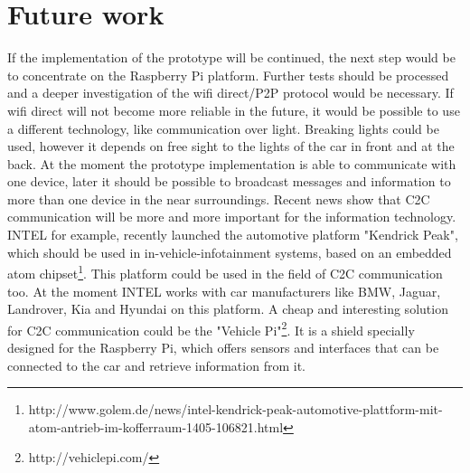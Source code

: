 \section{Future work}
\label{sec:FutureWork}
If the implementation of the prototype will be continued, the next step would be to concentrate on the Raspberry Pi platform. Further tests should be processed and a deeper investigation of the wifi direct/P2P protocol would be necessary. If wifi direct will not become more reliable in the future, it would be possible to use a different technology, like communication over light. Breaking lights could be used, however it depends on free sight to the lights of the car in front and at the back. At the moment the prototype implementation is able to communicate with one device, later it should be possible to broadcast messages and information to more than one device in the near surroundings. Recent news show that C2C communication will be more and more important for the information technology. INTEL for example, recently launched the automotive platform "Kendrick Peak", which should be used in in-vehicle-infotainment systems, based on an embedded atom chipset\footnote{http://www.golem.de/news/intel-kendrick-peak-automotive-plattform-mit-atom-antrieb-im-kofferraum-1405-106821.html}. This platform could be used in the field of C2C communication too. At the moment INTEL works with car manufacturers like BMW, Jaguar, Landrover, Kia and Hyundai on this platform. A cheap and interesting solution for C2C communication could be the "Vehicle Pi"\footnote{http://vehiclepi.com/}. It is a shield specially designed for the Raspberry Pi, which offers sensors and interfaces that can be connected to the car and retrieve information from it. 
